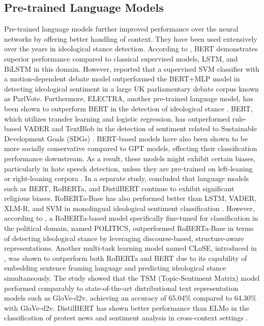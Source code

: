 \subsection*{\textbf{Pre-trained Language Models}}
Pre-trained language models further improved performance over the neural networks by offering better handling of context. They have been used extensively over the years in ideological stance detection. According to \citep{ozturk2024ideology}, BERT demonstrates superior performance compared to classical supervised models, LSTM, and BiLSTM in this domain. However, \citep{abercrombie2020parlvote} reported that a supervised SVM classifier with a motion-dependent debate model outperformed the BERT+MLP model in detecting ideological sentiment in a large UK parliamentary debate corpus known as ParlVote. Furthermore, ELECTRA, another pre-trained language model, has been shown to outperform BERT in the detection of ideological stance \citep{ozturk2024ideology}. BERT, which utilizes transfer learning and logistic regression, has outperformed rule-based VADER and TextBlob in the detection of sentiment related to Sustainable Development Goals (SDGs) \citep{rosenberg2023sentiment}. BERT-based models have also been shown to be more socially conservative compared to GPT models, effecting their classification performance downstream. As a result, these models might exhibit certain biases, particularly in hate speech detection, unless they are pre-trained on left-leaning or right-leaning corpora \citep{feng2023from}. In a separate study, \citep{abrar2025religious} concluded that language models such as BERT, RoBERTa, and DistilBERT continue to exhibit significant religious biases. RoBERTa-Base has also performed better than LSTM, VADER, XLM-R, and SVM in monolingual ideological sentiment classification \citep{antypas2023negativity}. However, according to \citep{ferracane2023integrated}, a RoBERTa-based model specifically fine-tuned for classification in the political domain, named POLITICS, outperformed RoBERTa-Base in terms of detecting ideological stance by leveraging discourse-based, structure-aware representations. Another multi-task learning model named CLoSE, introduced in \citep{kim2022close}, was shown to outperform both RoBERTa and BERT due to its capability of embedding sentence framing language and predicting ideological stance simultaneously. The study \citep{bhatia2018topic} showed that the TSM (Topic-Sentiment Matrix) model performed comparably to state-of-the-art distributional text representation models such as GloVe-d2v, achieving an accuracy of 65.04\% compared to 64.30\% with GloVe-d2v. DistilBERT has shown better performance than ELMo in the classification of protest news and sentiment analysis in cross-context settings \citep{buyukoz2020analyzing}.


